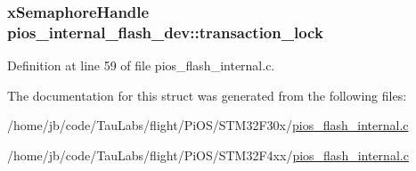 \hypertarget{structpios__internal__flash__dev_aff0936adda4381f50332373503f0f34e}{
\subsubsection[{transaction\-\_\-lock}]{\setlength{\rightskip}{0pt plus 5cm}x\-Semaphore\-Handle {\bf pios\-\_\-internal\-\_\-flash\-\_\-dev\-::transaction\-\_\-lock}}}\label{structpios__internal__flash__dev_aff0936adda4381f50332373503f0f34e}


\-Definition at line 59 of file pios\-\_\-flash\-\_\-internal.\-c.



\-The documentation for this struct was generated from the following files\-:\begin{DoxyCompactItemize}
\item 
/home/jb/code/\-Tau\-Labs/flight/\-Pi\-O\-S/\-S\-T\-M32\-F30x/\hyperlink{_s_t_m32_f30x_2pios__flash__internal_8c}{pios\-\_\-flash\-\_\-internal.\-c}\item 
/home/jb/code/\-Tau\-Labs/flight/\-Pi\-O\-S/\-S\-T\-M32\-F4xx/\hyperlink{_s_t_m32_f4xx_2pios__flash__internal_8c}{pios\-\_\-flash\-\_\-internal.\-c}\end{DoxyCompactItemize}
